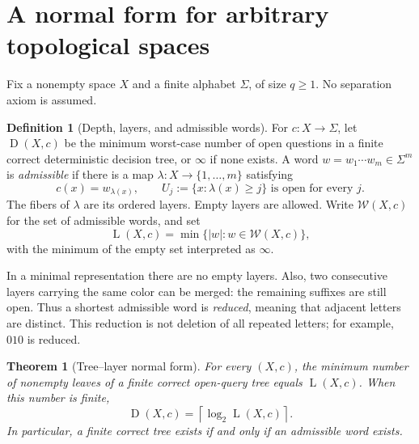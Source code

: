 \documentclass[11pt,letterpaper]{article}
\numberwithin{equation}{section}
\newtheorem{theorem}{Theorem}[section]
\theoremstyle{definition}
\newtheorem{definition}[definition]{Definition}
\theoremstyle{remark}
\theoremstyle{definition}
\newcommand{\ceil}[1]{\left\lceil#1\right\rceil}
\newcommand{\W}{\mathcal W}
\newcommand{\depth}{\operatorname{D}}
\newcommand{\layers}{\operatorname{L}}
\newcommand{\len}[1]{\lvert #1\rvert}
\begin{document}
\section{A normal form for arbitrary topological spaces}
\label{fo:sec:normal}

Fix a nonempty space $X$ and a finite alphabet $\Sigma$, of size $q\ge1$.
No separation axiom is assumed.

\begin{definition}[Depth, layers, and admissible words]
For $c:X\to\Sigma$, let $\depth(X,c)$ be the minimum worst-case number of open
questions in a finite correct deterministic decision tree, or $\infty$ if none
exists. A word $w=w_1\cdots w_m\in\Sigma^m$ is \emph{admissible} if there is a
map $\lambda:X\to\{1,\ldots,m\}$ satisfying
\begin{equation}\label{fo:eq:layer}
 c(x)=w_{\lambda(x)},\qquad
 U_j:=\{x:\lambda(x)\ge j\}\text{ is open for every }j.
\end{equation}
The fibers of $\lambda$ are its ordered layers. Empty layers are allowed.
Write $\W(X,c)$ for the set of admissible words, and set
\[
 \layers(X,c)=\min\{\len{w}:w\in\W(X,c)\},
\]
with the minimum of the empty set interpreted as $\infty$.
\end{definition}

In a minimal representation there are no empty layers. Also, two consecutive
layers carrying the same color can be merged: the remaining suffixes are still
open. Thus a shortest admissible word is \emph{reduced}, meaning that adjacent
letters are distinct. This reduction is not deletion of all repeated letters;
for example, $010$ is reduced.

\begin{theorem}[Tree--layer normal form]\label{fo:thm:normal}
For every $(X,c)$, the minimum number of nonempty leaves of a finite correct
open-query tree equals $\layers(X,c)$. When this number is finite,
\begin{equation}\label{fo:eq:depth-log}
 \depth(X,c)=\ceil{\log_2\layers(X,c)}.
\end{equation}
In particular, a finite correct tree exists if and only if an admissible word
exists.
\end{theorem}
\end{document}
